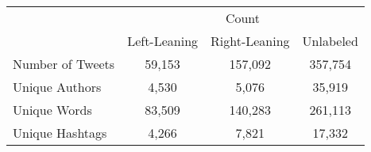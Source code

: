 %
    
    \centering
    \begin{tabular}{lccc}
        \toprule\toprule
             & \multicolumn{3}{c}{Count} \\
             \cmidrule(lr){2-4} 
             & Left-Leaning & Right-Leaning & Unlabeled \\ \hline
            Number of Tweets & 59,153 & 157,092 & 357,754 \\ 
            Unique Authors & 4,530 & 5,076 & 35,919 \\ 
            Unique Words & 83,509 & 140,283 & 261,113 \\ 
            Unique Hashtags & 4,266 & 7,821 & 17,332 \\
        \bottomrule\bottomrule
    \end{tabular}

%